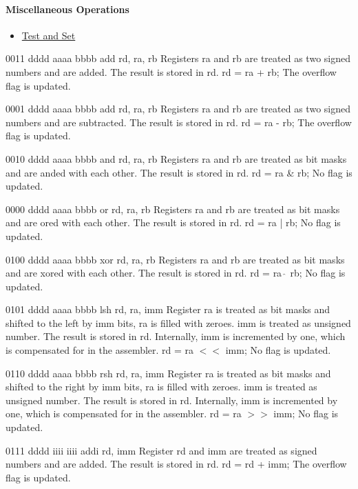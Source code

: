 \paragraph{Miscellaneous Operations}
\begin{itemize}
\nolistskip
\item \hyperref[instr_tst]{Test and Set}
\end{itemize}

	{0011 dddd aaaa bbbb}
	{add rd, ra, rb}
	{Registers ra and rb are treated as two signed numbers and are added. The result is stored in rd.}
	{rd = ra + rb;}
	{The overflow flag is updated.}

	{0001 dddd aaaa bbbb}
	{add rd, ra, rb}
	{Registers ra and rb are treated as two signed numbers and are subtracted. The result is stored in rd.}
	{rd = ra - rb;}
	{The overflow flag is updated.}
	
	{0010 dddd aaaa bbbb}
	{and rd, ra, rb}
	{Registers ra and rb are treated as bit masks and are anded with each other. The result is stored in rd.}
	{rd = ra \& rb;}
	{No flag is updated.}

	{0000 dddd aaaa bbbb}
	{or rd, ra, rb}
	{Registers ra and rb are treated as bit masks and are ored with each other. The result is stored in rd.}
	{rd = ra | rb;}
	{No flag is updated.}

	{0100 dddd aaaa bbbb}
	{xor rd, ra, rb}
	{Registers ra and rb are treated as bit masks and are xored with each other. The result is stored in rd.}
	{rd = ra $\hat\ $ rb;}
	{No flag is updated.}
	
	{0101 dddd aaaa bbbb}
	{lsh rd, ra, imm}
	{Register ra is treated as bit masks and shifted to the left by imm bits, ra is filled with zeroes. imm is treated as unsigned number. The result is stored in rd. Internally, imm is incremented by one, which is compensated for in the assembler.}
	{rd = ra $<<$ imm;}
	{No flag is updated.}
	
	{0110 dddd aaaa bbbb}
	{rsh rd, ra, imm}
	{Register ra is treated as bit masks and shifted to the right by imm bits, ra is filled with zeroes. imm is treated as unsigned number. The result is stored in rd. Internally, imm is incremented by one, which is compensated for in the assembler.}
	{rd = ra $>>$ imm;}
	{No flag is updated.}

	{0111 dddd iiii iiii}
	{addi rd, imm}
	{Register rd and imm are treated as signed numbers and are added. The result is stored in rd.}
	{rd = rd + imm;}
	{The overflow flag is updated.}


